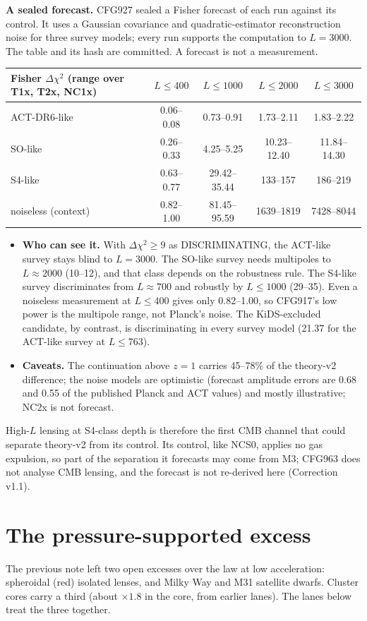 \documentclass[10pt]{article}
\begin{document}
\textbf{A sealed forecast.} CFG927 sealed a Fisher forecast of each run against its control. It uses a Gaussian covariance and quadratic-estimator reconstruction noise for three survey models; every run supports the computation to $L=3000$. The table and its hash are committed. A forecast is not a measurement.
\begin{center}\small
\begin{tabular}{lcccc}
\toprule
Fisher $\Delta\chi^2$ (range over T1x, T2x, NC1x) & $L\le400$ & $L\le1000$ & $L\le2000$ & $L\le3000$\\
\midrule
ACT-DR6-like & 0.06--0.08 & 0.73--0.91 & 1.73--2.11 & 1.83--2.22\\
SO-like & 0.26--0.33 & 4.25--5.25 & 10.23--12.40 & 11.84--14.30\\
S4-like & 0.63--0.77 & 29.42--35.44 & 133--157 & 186--219\\
noiseless (context) & 0.82--1.00 & 81.45--95.59 & 1639--1819 & 7428--8044\\
\bottomrule
\end{tabular}
\end{center}
\begin{itemize}
\item \textbf{Who can see it.} With $\Delta\chi^2\ge9$ as DISCRIMINATING, the ACT-like survey stays blind to $L=3000$. The SO-like survey needs multipoles to $L\approx2000$ (10--12), and that class depends on the robustness rule. The S4-like survey discriminates from $L\approx700$ and robustly by $L\le1000$ (29--35). Even a noiseless measurement at $L\le400$ gives only 0.82--1.00, so CFG917's low power is the multipole range, not Planck's noise. The KiDS-excluded candidate, by contrast, is discriminating in every survey model (21.37 for the ACT-like survey at $L\le763$).
\item \textbf{Caveats.} The continuation above $z=1$ carries 45--78\% of the theory-v2 difference; the noise models are optimistic (forecast amplitude errors are 0.68 and 0.55 of the published Planck and ACT values) and mostly illustrative; NC2x is not forecast.
\end{itemize}
High-$L$ lensing at S4-class depth is therefore the first CMB channel that could separate theory-v2 from its control. Its control, like NCS0, applies no gas expulsion, so part of the separation it forecasts may come from M3; CFG963 does not analyse CMB lensing, and the forecast is not re-derived here (Correction v1.1).

\section{The pressure-supported excess}
The previous note left two open excesses over the law at low acceleration: spheroidal (red) isolated lenses, and Milky Way and M31 satellite dwarfs. Cluster cores carry a third (about $\times1.8$ in the core, from earlier lanes). The lanes below treat the three together.
\end{document}
